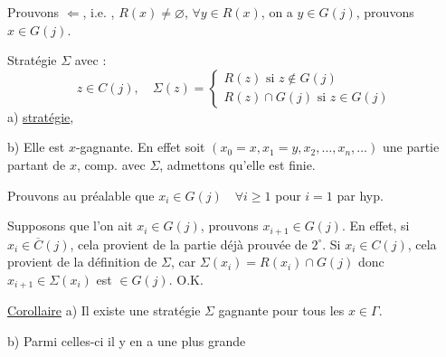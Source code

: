 Prouvons $\Longleftarrow$, i.e. , $R(x)\ne\varnothing$, $\forall y\in R(x)$, on a $y\in G(j)$, prouvons $x\in G(j)$.

Stratégie $\Sigma$ avec :
\[
z\in C(j),\quad\Sigma(z)=\begin{cases}R(z)\text{ si }z\notin G(j)\\ R(z)\cap G(j)\text{ si }z\in G(j)\end{cases}
\]
 a) \uline{ stratégie}, 


 b) Elle est $x$-gagnante. En effet soit $(x_0=x,x_1=y,x_2,\ldots,x_n,\ldots)$ une partie partant de $x$, comp. avec $\Sigma$, admettons qu'elle est finie.

Prouvons au préalable  que $x_i\in G(j)\quad\forall i\geq1$   pour $i=1$ par hyp.

Supposons que  l'on ait $x_i\in G(j)$, prouvons $x_{i+1}\in G(j)$. En effet, si $x_i\in\overline C(j)$, cela provient de la partie déjà prouvée de $2^\circ$.
Si $x_i\in C(j)$, cela provient de la définition de $\Sigma$, car $\Sigma(x_i)=R(x_i)\cap G(j)$ donc $x_{i+1}\in\Sigma(x_i)$  est $\in G(j)$. O.K.

\uline{Corollaire} 
a) Il existe une  stratégie $\Sigma$ gagnante pour tous les $x\in\Gamma$.

 b) Parmi celles-ci il y en a une plus grande
